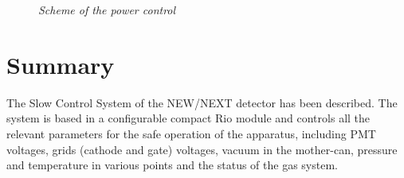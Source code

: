 \begin{figure}[ht!]
    \bigskip
    \begin{center}\leavevmode
        \caption{\textit{Scheme of the power control}}
        \label{fig:power:power}
    \end{center}
\end{figure}

\section{Summary}
The Slow Control System of the NEW/NEXT detector has been described. The system is based in a configurable compact Rio module and controls all the relevant parameters for the safe operation of the apparatus, including PMT voltages, grids (cathode and gate) voltages, vacuum in the mother-can, pressure and temperature in various points and the status of the gas system. 
